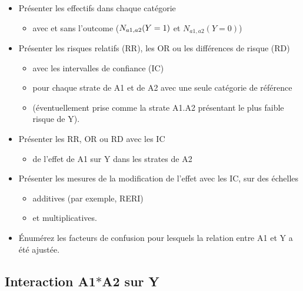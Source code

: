 \documentclass[
]{book}
\providecommand{\tightlist}{%
  \setlength{\itemsep}{0pt}\setlength{\parskip}{0pt}}
\begin{document}
\begin{itemize}
\tightlist
\item
  Présenter les effectifs dans chaque catégorie

  \begin{itemize}
  \tightlist
  \item
    avec et sans l'outcome (\(\small N_{a1,a2}(Y=1)\) et \(N_{a1,a2}(Y=0)\))
  \end{itemize}
\item
  Présenter les risques relatifs (RR), les OR ou les différences de risque (RD)

  \begin{itemize}
  \tightlist
  \item
    avec les intervalles de confiance (IC)
  \item
    pour chaque strate de A1 et de A2 avec une seule catégorie de référence
  \item
    (éventuellement prise comme la strate A1.A2 présentant le plus faible risque de Y).
  \end{itemize}
\item
  Présenter les RR, OR ou RD avec les IC

  \begin{itemize}
  \tightlist
  \item
    de l'effet de A1 sur Y dans les strates de A2
  \end{itemize}
\item
  Présenter les mesures de la modification de l'effet avec les IC, sur des échelles

  \begin{itemize}
  \tightlist
  \item
    additives (par exemple, RERI)
  \item
    et multiplicatives.
  \end{itemize}
\item
  Énumérez les facteurs de confusion pour lesquels la relation entre A1 et Y a été ajustée.
\end{itemize}

\hypertarget{interaction-a1a2-sur-y}{%
\subsection*{\texorpdfstring{Interaction A1\(*\)A2 sur Y}{Interaction A1*A2 sur Y}}\label{interaction-a1a2-sur-y}}
\end{document}
